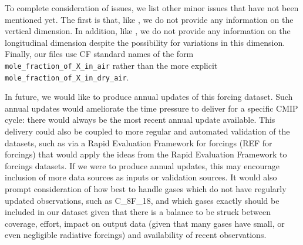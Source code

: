 To complete consideration of issues, we list other minor issues that have not been mentioned yet.
The first is that, like \citet{meinshausen_historical-ghgs_2017}, we do not provide any information on the vertical dimension.
In addition, like \citet{meinshausen_historical-ghgs_2017}, we do not provide any information on the longitudinal dimension
despite the possibility for variations in this dimension.
Finally, our files use CF standard names \citep{eaton_cf-conventions_2026}
of the form \texttt{mole\_fraction\_of\_X\_in\_air}
rather than the more explicit \texttt{mole\_fraction\_of\_X\_in\_dry\_air}.

In future, we would like to produce annual updates of this forcing dataset.
Such annual updates would ameliorate the time pressure to deliver for a specific CMIP cycle:
there would always be the most recent annual update available.
This delivery could also be coupled to more regular and automated validation of the datasets,
such as via a Rapid Evaluation Framework for forcings (REF for forcings)
that would apply the ideas from the Rapid Evaluation Framework \citep{climate-ref_docs_2026,hassler_ref_2026,hoffman_ref_2026} to forcings datasets.
If we were to produce annual updates, this may encourage inclusion of more data sources as inputs or validation sources.
It would also prompt consideration
of how best to handle gases which do not have regularly updated observations, such as C_8F_18,
and which gases exactly should be included in our dataset
given that there is a balance to be struck between coverage, effort,
impact on output data (given that many gases have small, or even negligible radiative forcings)
and availability of recent observations.
